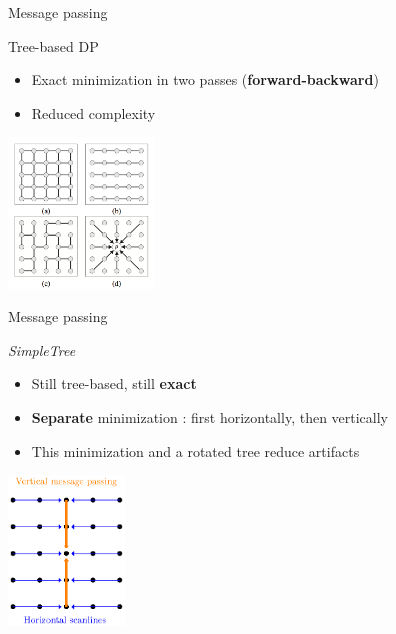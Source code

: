 \documentclass[12pt]{beamer}
\begin{document}
\begin{frame}{Message passing}
  \begin{block}{Tree-based DP}
    \begin{itemize}
      \item Exact minimization in two passes (\textbf{forward-backward})
      \item Reduced complexity
    \end{itemize}
  \end{block}

  \begin{center}
    \includegraphics[height=4cm]{../images/Tree-DP.png}
  \end{center}
\end{frame}

\begin{frame}{Message passing}
  \begin{block}{\emph{SimpleTree}}
    \begin{itemize}
      \item Still tree-based, still \textbf{exact}
      \item \textbf{Separate} minimization : first horizontally, then vertically
      \item This minimization and a rotated tree reduce artifacts
    \end{itemize}
  \end{block}

  \begin{center}
    \includegraphics[height=4cm]{graphics/disparity-simpletree.eps}
  \end{center}
\end{frame}
\end{document}
